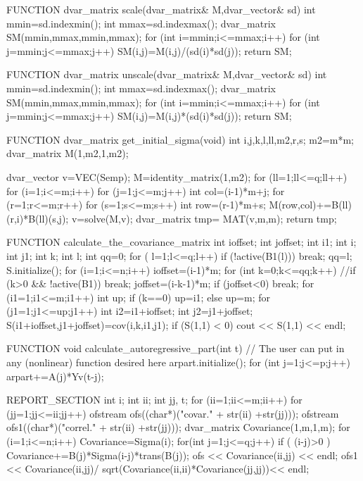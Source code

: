 FUNCTION dvar_matrix scale(dvar_matrix& M,dvar_vector& sd)
   int mmin=sd.indexmin();
   int mmax=sd.indexmax();
   dvar_matrix SM(mmin,mmax,mmin,mmax);
   for (int i=mmin;i<=mmax;i++)
     for (int j=mmin;j<=mmax;j++)
       SM(i,j)=M(i,j)/(sd(i)*sd(j));
   return SM;
       
FUNCTION dvar_matrix unscale(dvar_matrix& M,dvar_vector& sd)
   int mmin=sd.indexmin();
   int mmax=sd.indexmax();
   dvar_matrix SM(mmin,mmax,mmin,mmax);
   for (int i=mmin;i<=mmax;i++)
     for (int j=mmin;j<=mmax;j++)
       SM(i,j)=M(i,j)*(sd(i)*sd(j));
   return SM;
       
FUNCTION dvar_matrix get_initial_sigma(void)
   int i,j,k,l,ll,m2,r,s;
   m2=m*m;
   dvar_matrix M(1,m2,1,m2);
   
   dvar_vector v=VEC(Semp);
   M=identity_matrix(1,m2);
   for (ll=1;ll<=q;ll++) 
   {
     for (i=1;i<=m;i++) 
     {
       for (j=1;j<=m;j++) 
       {
         int col=(i-1)*m+j;
         for (r=1;r<=m;r++)
         {
           for (s=1;s<=m;s++) 
           {
             int row=(r-1)*m+s;
             M(row,col)+=B(ll)(r,i)*B(ll)(s,j);
           }
         }
       }
     }
   } 
   v=solve(M,v);
   dvar_matrix tmp= MAT(v,m,m);
   return tmp;
  
FUNCTION calculate_the_covariance_matrix
  int ioffset; int joffset; int i1; int i; int j1;
  int k; int l;
  int qq=0;
  for ( l=1;l<=q;l++) {
    if (!active(B1(l))) break;
    qq=l;
  }
  S.initialize();
  for (i=1;i<=n;i++) {
    ioffset=(i-1)*m;  
    for (int k=0;k<=qq;k++) {
      //if (k>0 && !active(B1)) break;
      joffset=(i-k-1)*m;  
      if (joffset<0) break;
      for (i1=1;i1<=m;i1++) {  
        int up;
        if (k==0) 
	  up=i1;
	else  
	  up=m;
        for (j1=1;j1<=up;j1++) {  
          int i2=i1+ioffset;
	  int j2=j1+joffset;
          S(i1+ioffset,j1+joffset)=cov(i,k,i1,j1);
        }  	
      }  
    }    
    if (S(1,1) < 0)
      cout << S(1,1) << endl;
  }

FUNCTION void calculate_autoregressive_part(int t)
  // The user can put in any (nonlinear) function desired here
  arpart.initialize();
  for (int j=1;j<=p;j++) arpart+=A(j)*Yv(t-j);
  
REPORT_SECTION
  int i; int ii; int jj, t;
  for (ii=1;ii<=m;ii++)  
  {
    for (jj=1;jj<=ii;jj++)  
    {
      ofstream ofs((char*)("covar." + str(ii) +str(jj)));
      ofstream ofs1((char*)("correl." + str(ii) +str(jj)));
      dvar_matrix Covariance(1,m,1,m);
      for (i=1;i<=n;i++) {
        Covariance=Sigma(i);
        for(int j=1;j<=q;j++)
          if ( (i-j)>0 ) Covariance+=B(j)*Sigma(i-j)*trans(B(j));
        ofs << Covariance(ii,jj) << endl;
        ofs1 << Covariance(ii,jj)/
          sqrt(Covariance(ii,ii)*Covariance(jj,jj))<< endl;
      }
    }
  }
  
